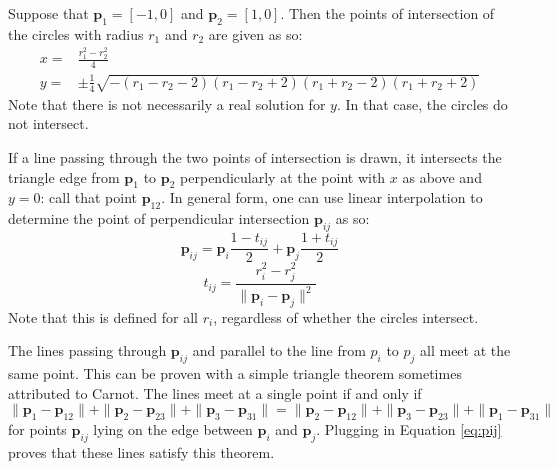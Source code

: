 \documentclass{amsart}[12pt]
\begin{document}
Suppose that $\mathbf p_1 = [-1,0]$ and $\mathbf p_2 = [1,0]$. Then the points
of intersection of the circles with radius $r_1$ and $r_2$ are given as so:
\begin{equation}\begin{split}
x =& \frac{r^2_1 - r^2_2}{4}\\
y =& \pm \frac{1}{4} \sqrt{-
\left(r_1 - r_2 - 2\right)
\left(r_1 - r_2 + 2\right)
\left(r_1 + r_2 - 2\right)
\left(r_1 + r_2 + 2\right)}
\end{split}\end{equation}
Note that there is not necessarily a real solution for $y$. In that case, the
circles do not intersect.

If a line passing through the two points of intersection is drawn, it intersects
the triangle edge from $\mathbf p_1$ to $\mathbf p_2$ perpendicularly at
the point with $x$ as above and $y=0$: call that point $\mathbf p_{12}$. In
general form, one can use linear interpolation to determine the point of
perpendicular intersection $\mathbf p_{ij}$ as so:
\begin{equation}\label{eq:pij}
\mathbf p_{ij} = \mathbf p_i \frac{1-t_{ij}}{2} + \mathbf p_j \frac{1+t_{ij}}{2}
\end{equation}
\begin{equation}
t_{ij} = \frac{r_i^2 - r_j^2}{\| \mathbf p_i - \mathbf p_j \|^2}
\end{equation}
Note that this is defined for all $r_i$, regardless of whether the circles
intersect.

The lines passing through $\mathbf p_{ij}$ and parallel to the line from
$p_i$ to $p_j$ all meet at the same point. This can be proven with a simple
triangle theorem sometimes attributed to Carnot. The lines meet at a single
point if and only if \cite{posamentier}\cite{wohlgemuth}
\begin{equation}
  \|\mathbf p_1 - \mathbf p_{12}\| +
  \|\mathbf p_2 - \mathbf p_{23}\| +
  \|\mathbf p_3 - \mathbf p_{31}\| =
  \|\mathbf p_2 - \mathbf p_{12}\| +
  \|\mathbf p_3 - \mathbf p_{23}\| +
  \|\mathbf p_1 - \mathbf p_{31}\|
\end{equation}
for points $\mathbf p_{ij}$ lying on the edge between $\mathbf p_i$ and
$\mathbf p_j$. Plugging in Equation \ref{eq:pij} proves that these lines
satisfy this theorem.
\end{document}
